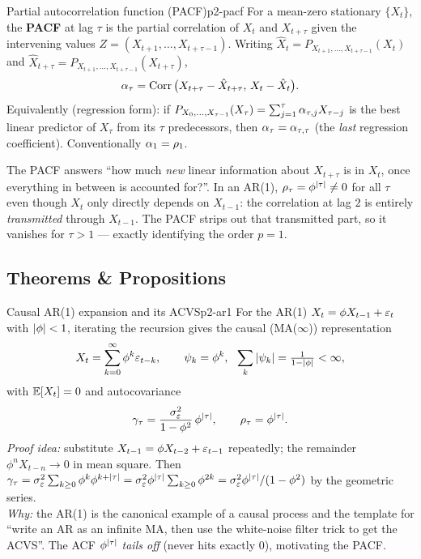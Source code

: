 \begin{definition}{Partial autocorrelation function (PACF)}{p2-pacf}
For a mean-zero stationary $\{X_t\}$, the \textbf{PACF} at lag $\tau$ is the
partial correlation of $X_t$ and $X_{t+\tau}$ given the intervening values
$Z=(X_{t+1},\dots,X_{t+\tau-1})$. Writing
$\hat X_t=P_{X_{t+1},\dots,X_{t+\tau-1}}(X_t)$ and
$\hat X_{t+\tau}=P_{X_{t+1},\dots,X_{t+\tau-1}}(X_{t+\tau})$,
\[
\alpha_\tau=\operatorname{Corr}\big(X_{t+\tau}-\hat X_{t+\tau},\,X_t-\hat X_t\big).
\]
Equivalently (regression form): if
$P_{X_0,\dots,X_{\tau-1}}(X_\tau)=\sum_{j=1}^{\tau}\alpha_{\tau,j}X_{\tau-j}$ is
the best linear predictor of $X_\tau$ from its $\tau$ predecessors, then
$\alpha_\tau=\alpha_{\tau,\tau}$ (the \emph{last} regression coefficient).
Conventionally $\alpha_1=\rho_1$.
\end{definition}

\begin{intuition}
The PACF answers ``how much \emph{new} linear information about $X_{t+\tau}$ is
in $X_t$, once everything in between is accounted for?''. In an AR(1),
$\rho_\tau=\phi^{\left\lvert \tau \right\rvert}\ne0$ for all $\tau$ even though $X_t$ only directly
depends on $X_{t-1}$: the correlation at lag $2$ is entirely \emph{transmitted}
through $X_{t-1}$. The PACF strips out that transmitted part, so it vanishes for
$\tau>1$ --- exactly identifying the order $p=1$.
\end{intuition}

\subsection{Theorems \& Propositions}

\begin{proposition}{Causal AR(1) expansion and its ACVS}{p2-ar1}
For the AR(1) $X_t=\phi X_{t-1}+\varepsilon_t$ with $\left\lvert \phi \right\rvert<1$, iterating the
recursion gives the causal (MA($\infty$)) representation
\[
X_t=\sum_{k=0}^{\infty}\phi^{k}\eps_{t-k},
\qquad \psi_k=\phi^k,\ \ \sum_k\abs{\psi_k}=\tfrac1{1-\abs\phi}<\infty,
\]
with $\mathbb{E}[X_t]=0$ and autocovariance
\[
\gamma_\tau=\frac{\sigma_\varepsilon^2}{1-\phi^2}\,\phi^{\left\lvert \tau \right\rvert},
\qquad
\rho_\tau=\phi^{\left\lvert \tau \right\rvert}.
\]
\textit{Proof idea:} substitute $X_{t-1}=\phi X_{t-2}+\varepsilon_{t-1}$ repeatedly;
the remainder $\phi^{n}X_{t-n}\to0$ in mean square. Then
$\gamma_\tau=\sigma_\varepsilon^2\sum_{k\ge0}\phi^k\phi^{k+\left\lvert \tau \right\rvert}
=\sigma_\varepsilon^2\phi^{\left\lvert \tau \right\rvert}\sum_{k\ge0}\phi^{2k}
=\sigma_\varepsilon^2\phi^{\left\lvert \tau \right\rvert}/(1-\phi^2)$ by the geometric series.\\
\textit{Why:} the AR(1) is the canonical example of a causal process and the
template for ``write an AR as an infinite MA, then use the white-noise filter
trick to get the ACVS''. The ACF $\phi^{\left\lvert \tau \right\rvert}$ \emph{tails off} (never hits
exactly $0$), motivating the PACF.
\end{proposition}

